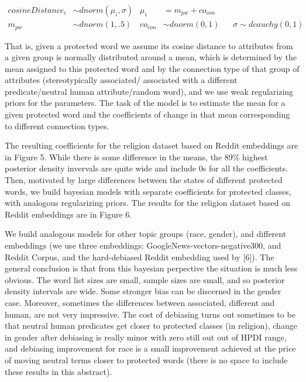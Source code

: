 \documentclass[12pt,dvipsnames,enabledeprecatedfontcommands]{scrartcl}
\begin{document}
\footnotesize 

\vspace{-5mm}

\begin{align}
cosineDistance_i  & \sim dnorm(\mu_i, \sigma) &
\mu_i & = m_{pw} + co_{con} \tag{Model}\\
m_{pw} & \sim dnorm(1,.5)  & 
co_{con} & \sim dnorm(0,1)  \,\,\,\,\,
 & \sigma  \sim  dcauchy(0,1) \tag{Priors}
\end{align}

\normalsize 

\vspace{-2mm}

\noindent That is, given a protected word we assume its cosine distance
to attributes from a given group is normally distributed around a mean,
which is determined by the mean assigned to this protected word and by
the connection type of that group of attributes (stereotypically
associated/ associated with a different predicate/neutral human
attribute/random word), and we use weak regularizing priors for the
parameters. The task of the model is to estimate the mean for a given
protected word and the coefficients of change in that mean corresponding
to different connection types.

The resulting coefficients for the religion dataset based on Reddit
embeddings are in Figure 5. While there is some difference in the means,
the 89\% highest posterior density invervals are quite wide and include
0s for all the coefficients. Then, motivated by large differences
between the states of different protected words, we build bayesian
models with separate coefficients for protected classes, with analogous
regularizing priors. The results for the religion dataset based on
Reddit embeddings are in Figure 6.

We build analogous models for other topic groups (race, gender), and
different embeddings (we use three embeddings:
GoogleNews-vectors-negative300, and Reddit Corpus, and the hard-debiased
Reddit embedding used by {[}6{]}). The general conclusion is that from
this bayesian perpective the situation is much less obvious. The word
list sizes are small, sample sizes are small, and so posterior density
intervals are wide. Some stronger bias can be discerned in the gender
case. Moreover, sometimes the differences between associated, different
and human, are not very impressive. The cost of debiasing turns out
sometimes to be that neutral human predicates get closer to protected
classes (in religion), change in gender after debiasing is really minor
with zero still out out of HPDI range, and debiasing improvement for
race is a small improvement achieved at the price of moving neutral
terms closer to protected words (there is no space to include these
results in this abstract).
\end{document}

